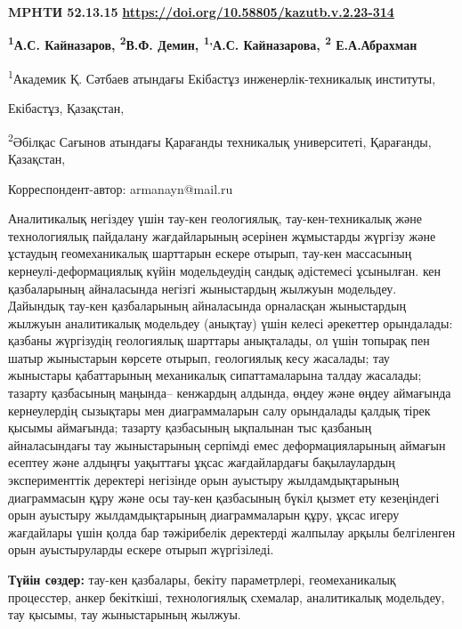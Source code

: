 \newpage
{}
{\bfseries MPHTИ 52.13.15}
\hfill {\bfseries \href{https://doi.org/10.58805/kazutb.v.2.23-314}{https://doi.org/10.58805/kazutb.v.2.23-314}}


\begin{center}
{\bfseries \textsuperscript{1}А.С. Кайназаров\envelope, \textsuperscript{2}В.Ф. Демин, \textsuperscript{1,}А.С. Кайназарова, \textsuperscript{2} Е.А.Абрахман}

\textsuperscript{1}Академик Қ. Сәтбаев атындағы Екібастұз
инженерлік-техникалық институты,

Екібастұз, Қазақстан,

\textsuperscript{2}Әбілқас Сағынов атындағы Қарағанды техникалық
университеті, Қарағанды, Қазақстан,

\envelope Корреспондент-автор: armanayn@mail.ru
\end{center}

Аналитикалық негіздеу үшін тау-кен геологиялық, тау-кен-техникалық және
технологиялық пайдалану жағдайларының әсерінен жұмыстарды жүргізу және
ұстаудың геомеханикалық шарттарын ескере отырып, тау-кен массасының
кернеулі-деформациялық күйін модельдеудің сандық әдістемесі ұсынылған.
кен қазбаларының айналасында негізгі жыныстардың жылжуын модельдеу.
Дайындық тау-кен қазбаларының айналасында орналасқан жыныстардың жылжуын
аналитикалық модельдеу (анықтау) үшін келесі әрекеттер орындалады:
қазбаны жүргізудің геологиялық шарттары анықталады, ол үшін топырақ пен
шатыр жыныстарын көрсете отырып, геологиялық кесу жасалады; тау
жыныстары қабаттарының механикалық сипаттамаларына талдау жасалады;
тазарту қазбасының маңында-- кенжардың алдында, өңдеу және өңдеу
аймағында кернеулердің сызықтары мен диаграммаларын салу орындалады
қалдық тірек қысымы аймағында; тазарту қазбасының ықпалынан тыс қазбаның
айналасындағы тау жыныстарының серпімді емес деформацияларының аймағын
есептеу және алдыңғы уақыттағы ұқсас жағдайлардағы бақылаулардың
эксперименттік деректері негізінде орын ауыстыру жылдамдықтарының
диаграммасын құру және осы тау-кен қазбасының бүкіл қызмет ету
кезеңіндегі орын ауыстыру жылдамдықтарының диаграммаларын құру, ұқсас
игеру жағдайлары үшін қолда бар тәжірибелік деректерді жалпылау арқылы
белгіленген орын ауыстыруларды ескере отырып жүргізіледі.

{\bfseries Түйін сөздер:} тау-кен қазбалары, бекіту параметрлері,
геомеханикалық процесстер, анкер бекіткіші, технологиялық схемалар,
аналитикалық модельдеу, тау қысымы, тау жыныстарының жылжуы.

